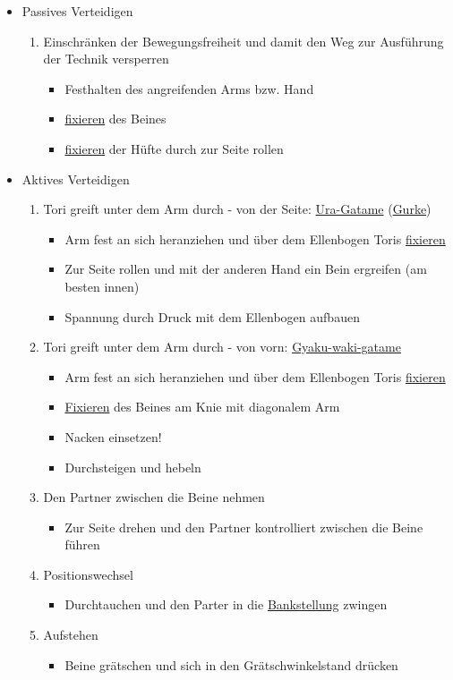 \documentclass[justified, a4paper, notitlepage, captions=tableheading, nobib]{tufte-handout}
\begin{document}
\begin{itemize}
\item Passives Verteidigen
\begin{enumerate}
\item Einschränken der Bewegungsfreiheit und damit den Weg zur Ausführung der Technik versperren
\begin{itemize}
\item Festhalten des angreifenden Arms bzw. Hand
\item \hyperref[org62822f6]{fixieren} des Beines
\item \hyperref[org62822f6]{fixieren} der Hüfte durch zur Seite rollen
\end{itemize}
\end{enumerate}
\item Aktives Verteidigen
\begin{enumerate}
\item Tori greift unter dem Arm durch - von der Seite: \hyperref[org5a515a8]{Ura-Gatame} (\hyperref[org12fb863]{Gurke})
\begin{itemize}
\item Arm fest an sich heranziehen und über dem Ellenbogen Toris \hyperref[org62822f6]{fixieren}
\item Zur Seite rollen und mit der anderen Hand ein Bein ergreifen (am besten innen)
\item Spannung durch Druck mit dem Ellenbogen aufbauen
\end{itemize}
\item Tori greift unter dem Arm durch - von vorn: \hyperref[org96343f4]{Gyaku-waki-gatame} \citep[S. 46]{kashiwazaki2012einführung}
\begin{itemize}
\item Arm fest an sich heranziehen und über dem Ellenbogen Toris \hyperref[org62822f6]{fixieren}
\item \hyperref[org62822f6]{Fixieren} des Beines am Knie mit diagonalem Arm
\item Nacken einsetzen!
\item Durchsteigen und hebeln
\end{itemize}
\item Den Partner zwischen die Beine nehmen
\begin{itemize}
\item Zur Seite drehen und den Partner kontrolliert zwischen die Beine führen
\end{itemize}
\item Positionswechsel
\begin{itemize}
\item Durchtauchen und den Parter in die \hyperref[orgd4877a8]{Bankstellung} zwingen
\end{itemize}
\item Aufstehen
\begin{itemize}
\item Beine grätschen und sich in den Grätschwinkelstand drücken
\end{itemize}
\end{enumerate}
\end{itemize}
\end{document}
